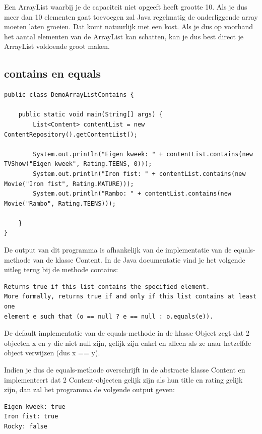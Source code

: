 \documentclass{tstextbook}
\begin{document}
Een ArrayList waarbij je de capaciteit niet opgeeft heeft grootte 10. Als je dus meer dan 10 elementen gaat toevoegen zal Java regelmatig de onderliggende array moeten laten groeien. Dat komt natuurlijk met een kost. Als je dus op voorhand het aantal elementen van de ArrayList  kan schatten, kan je dus best direct je ArrayList voldoende groot maken.

\subsection{contains en equals}

\begin{lstlisting}
public class DemoArrayListContains {

	public static void main(String[] args) {
		List<Content> contentList = new ContentRepository().getContentList();

		System.out.println("Eigen kweek: " + contentList.contains(new TVShow("Eigen kweek", Rating.TEENS, 0)));
		System.out.println("Iron fist: " + contentList.contains(new Movie("Iron fist", Rating.MATURE)));
		System.out.println("Rambo: " + contentList.contains(new Movie("Rambo", Rating.TEENS)));

	}
}
\end{lstlisting}

De output van dit programma is afhankelijk van de implementatie van de equals-methode van de klasse Content. 
In de Java documentatie vind je het volgende uitleg terug bij de methode contains:
\begin{verbatim}
Returns true if this list contains the specified element.
More formally, returns true if and only if this list contains at least one
element e such that (o == null ? e == null : o.equals(e)).
\end{verbatim}

De default implementatie van de equals-methode in de klasse Object zegt dat 2 objecten x en y die niet null zijn, gelijk zijn enkel en alleen als ze naar hetzelfde object verwijzen (dus x == y). 

Indien je dus de equals-methode overschrijft in de abstracte klasse Content en implementeert dat 2 Content-objecten gelijk zijn als hun title en rating gelijk zijn, dan zal het programma de volgende output geven:

\begin{verbatim}
Eigen kweek: true
Iron fist: true
Rocky: false
\end{verbatim}
\end{document}
